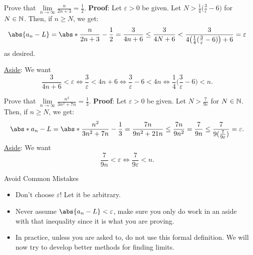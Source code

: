 \begin{Example}{}{}
    Prove that $ \displaystyle \lim\limits_{{n} \to {\infty}}\frac{n}{2n+3}=\frac{1}{2} $.
    \tcblower{}
    \textbf{Proof}: Let $ \varepsilon>0 $ be given. Let $ N>\frac{1}{4}\bigl(\frac{3}{\varepsilon}-6\bigr) $ for $ N\in\mathbb{N} $.
    Then, if $ n\ge N $, we get:
    \[ \abs{a_n-L}=\abs*{\frac{n}{2n+3}-\frac{1}{2}}=\frac{3}{4n+6}\le \frac{3}{4N+6}<\frac{3}{4\bigl(\frac{1}{4}(\frac{3}{\varepsilon}-6)\bigr)+6}=\varepsilon \]
    as desired.

    \underline{Aside}: We want
    \[ \frac{3}{4n+6}<\varepsilon\iff \frac{3}{\varepsilon}<4n+6\iff \frac{3}{\varepsilon}-6<4n\iff \frac{1}{4}\biggl(\frac{3}{\varepsilon}-6\biggr)<n. \]
\end{Example}
\begin{Example}{}{}
    Prove that $ \displaystyle \lim\limits_{{n} \to {\infty}}\frac{n^2}{3n^2+7n}=\frac{1}{3} $.
    \tcblower{}
    \textbf{Proof}: Let $ \varepsilon>0 $ be given. Let $ N>\frac{7}{9\varepsilon} $ for $ N\in\mathbb{N} $.
    Then, if $ n\ge N $, we get:
    \[ \abs*{a_n-L}=\abs*{\frac{n^2}{3n^2+7n}-\frac{1}{3}}=\frac{7n}{9n^2+21n}\le \frac{7n}{9n^2}=\frac{7}{9n}\le \frac{7}{9(\frac{7}{9\varepsilon})}=\varepsilon. \]
    \underline{Aside}: We want
    \[ \frac{7}{9n}<\varepsilon\iff \frac{7}{9\varepsilon}<n. \]
\end{Example}
\begin{Remark}{Avoid Common Mistakes}{}
    \begin{itemize}
        \item Don't choose $ \varepsilon $! Let it be arbitrary.
        \item Never assume $ \abs{a_n-L}<\varepsilon $, make sure you only do work in an aside with that inequality since it is what you
              are proving.
        \item In practice, unless you are asked to, do not use this formal definition. We will now try to develop better methods for finding limits.
    \end{itemize}
\end{Remark}

